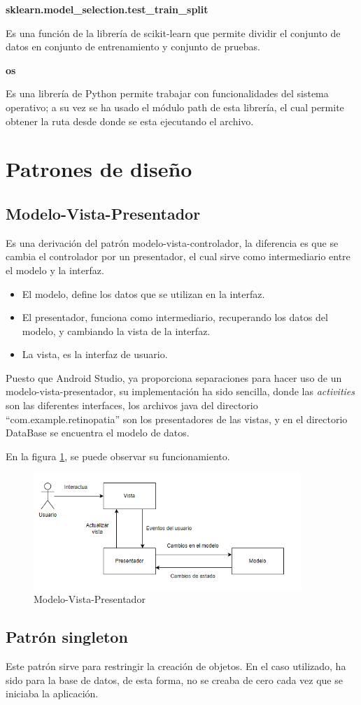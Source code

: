         \textbf{sklearn.model\_selection.test\_train\_split}
        
            Es una función de la librería de scikit-learn que permite dividir el conjunto de datos en conjunto de entrenamiento y conjunto de pruebas.
            
        \textbf{os}
        
            Es una librería de Python permite trabajar con funcionalidades del sistema operativo; a su vez se ha usado el módulo path de esta librería, el cual permite obtener la ruta desde donde se esta ejecutando el archivo.
    
\section{Patrones de diseño}
    \subsection{Modelo-Vista-Presentador}
        Es una derivación del patrón modelo-vista-controlador, la diferencia es que se cambia el controlador por un presentador, el cual sirve como intermediario entre el modelo y la interfaz.
        \begin{itemize}
            \item El modelo, define los datos que se utilizan en la interfaz.
            \item El presentador, funciona como intermediario, recuperando los datos del modelo, y cambiando la vista de la interfaz.
            \item La vista, es la interfaz de usuario.
        \end{itemize}
        
        Puesto que Android Studio, ya proporciona separaciones para hacer uso de un modelo-vista-presentador, su implementación ha sido sencilla, donde las \textit{activities} son las diferentes interfaces, los archivos java del directorio ``com.example.retinopatia'' son los presentadores de las vistas, y en el directorio DataBase se encuentra el modelo de datos.

        En la figura \ref{fig:modeloVistaPresentador}, se puede observar su funcionamiento.
        \begin{figure}[!ht]
                 \centering
                 \includegraphics[width=0.9\textwidth]{img/MVP.png}
                  \caption{Modelo-Vista-Presentador}
                 \label{fig:modeloVistaPresentador}
        \end{figure}
    \subsection{Patrón singleton}
        Este patrón sirve para restringir la creación de objetos. En el caso utilizado, ha sido para la base de datos, de esta forma, no se creaba de cero cada vez que se iniciaba la aplicación.
